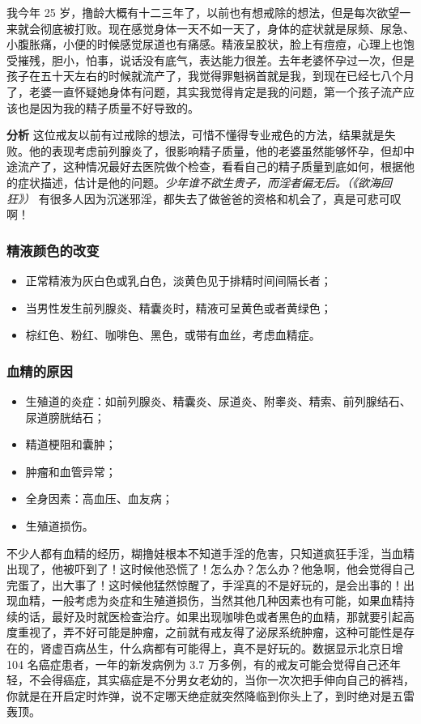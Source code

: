 \begin{case}[不孕不育]
    我今年 25 岁，撸龄大概有十二三年了，以前也有想戒除的想法，但是每次欲望一来就会彻底被打败。现在感觉身体一天不如一天了，身体的症状就是尿频、尿急、小腹胀痛，小便的时候感觉尿道也有痛感。精液呈胶状，脸上有痘痘，心理上也饱受摧残，胆小，怕事，说话没有底气，表达能力很差。去年老婆怀孕过一次，但是孩子在五十天左右的时候就流产了，我觉得罪魁祸首就是我，到现在已经七八个月了，老婆一直怀疑她身体有问题，其实我觉得肯定是我的问题，第一个孩子流产应该也是因为我的精子质量不好导致的。

    \textbf{分析} 这位戒友以前有过戒除的想法，可惜不懂得专业戒色的方法，结果就是失败。他的表现考虑前列腺炎了，很影响精子质量，他的老婆虽然能够怀孕，但却中途流产了，这种情况最好去医院做个检查，看看自己的精子质量到底如何，根据他的症状描述，估计是他的问题。\textit{少年谁不欲生贵子，而淫者偏无后。（《欲海回狂》）} 有很多人因为沉迷邪淫，都失去了做爸爸的资格和机会了，真是可悲可叹啊！
\end{case}

\subsubsection{精液颜色的改变}

\begin{itemize}
    \item 正常精液为灰白色或乳白色，淡黄色见于排精时间间隔长者；
    \item 当男性发生前列腺炎、精囊炎时，精液可呈黄色或者黄绿色；
    \item 棕红色、粉红、咖啡色、黑色，或带有血丝，考虑血精症。
\end{itemize}

\subsubsection{血精的原因}

\begin{itemize}
    \item 生殖道的炎症：如前列腺炎、精囊炎、尿道炎、附睾炎、精索、前列腺结石、尿道膀胱结石；
    \item 精道梗阻和囊肿；
    \item 肿瘤和血管异常；
    \item 全身因素：高血压、血友病；
    \item 生殖道损伤。
\end{itemize}

不少人都有血精的经历，糊撸娃根本不知道手淫的危害，只知道疯狂手淫，当血精出现了，他被吓到了！这时候他恐慌了！怎么办？怎么办？他急啊，他会觉得自己完蛋了，出大事了！这时候他猛然惊醒了，手淫真的不是好玩的，是会出事的！出现血精，一般考虑为炎症和生殖道损伤，当然其他几种因素也有可能，如果血精持续的话，最好及时就医检查治疗。如果出现咖啡色或者黑色的血精，那就要引起高度重视了，弄不好可能是肿瘤，之前就有戒友得了泌尿系统肿瘤，这种可能性是存在的，肾虚百病丛生，什么病都有可能得上，真不是好玩的。数据显示北京日增 104 名癌症患者，一年的新发病例为 3.7 万多例，有的戒友可能会觉得自己还年轻，不会得癌症，其实癌症是不分男女老幼的，当你一次次把手伸向自己的裤裆，你就是在开启定时炸弹，说不定哪天绝症就突然降临到你头上了，到时绝对是五雷轰顶。

